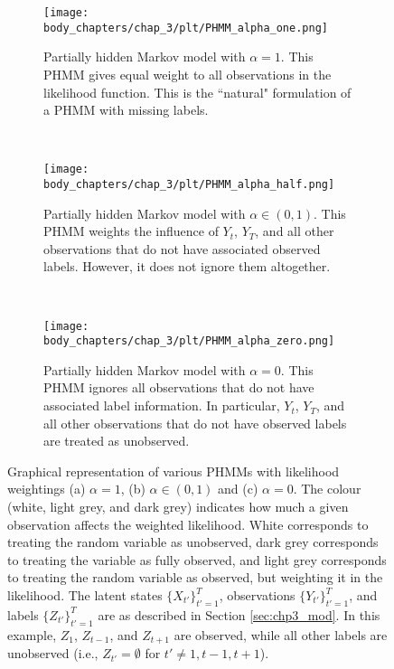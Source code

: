 \begin{figure}
    \centering
    \begin{subfigure}[t]{\textwidth}
        \centering
        \texttt{[image: body\_chapters/chap\_3/plt/PHMM\_alpha\_one.png]}
        \caption{Partially hidden Markov model with $\alpha = 1$. This PHMM gives equal weight to all observations in the likelihood function. This is the ``natural" formulation of a PHMM with missing labels.}
    \end{subfigure}%
    \\
    \begin{subfigure}[t]{\textwidth}
        \centering
        \texttt{[image: body\_chapters/chap\_3/plt/PHMM\_alpha\_half.png]}
        \caption{Partially hidden Markov model with $\alpha \in (0,1)$. This PHMM weights the influence of $Y_t$, $Y_T$, and all other observations that do not have associated observed labels. However, it does not ignore them altogether.}
    \end{subfigure}%
    \\
    \begin{subfigure}[t]{\textwidth}
        \centering
        \texttt{[image: body\_chapters/chap\_3/plt/PHMM\_alpha\_zero.png]}
        \caption{Partially hidden Markov model with $\alpha = 0$. This PHMM ignores all observations that do not have associated label information. In particular, $Y_t$, $Y_T$, and all other observations that do not have observed labels are treated as unobserved.}
    \end{subfigure}%
    \caption[Graphical representation of various PHMMs with various likelihood weightings.]{Graphical representation of various PHMMs with likelihood weightings (a) $\alpha = 1$, (b) $\alpha \in (0,1)$ and (c) $\alpha = 0$. The colour (white, light grey, and dark grey) indicates how much a given observation affects the weighted likelihood. White corresponds to treating the random variable as unobserved, dark grey corresponds to treating the variable as fully observed, and light grey corresponds to treating the random variable as observed, but weighting it in the likelihood. The latent states $\{X_{t'}\}_{t'=1}^{T}$, observations $\{Y_{t'}\}_{t'=1}^{T}$, and labels $\{Z_{t'}\}_{t'=1}^{T}$ are as described in Section \ref{sec:chp3_mod}. %
    In this example, $Z_1$, $Z_{t-1}$, and $Z_{t+1}$ are observed, while all other labels are unobserved (i.e., $Z_{t'} = \emptyset$ for $t' \neq 1,t-1,t+1$).}
    \label{fig:PHMM}
\end{figure}

